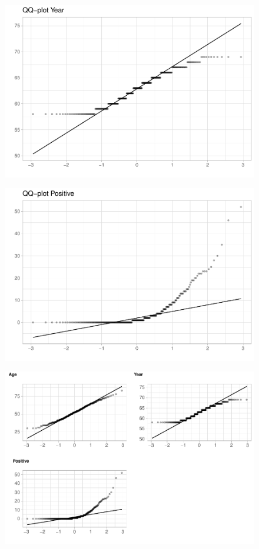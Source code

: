 \begin{figure}[H]\includegraphics[width=.9\linewidth]{img/EDA2_files/figure-latex/unnamed-chunk-18-2} \caption{}\end{figure}

\begin{figure}[H]\includegraphics[width=.9\linewidth]{img/EDA2_files/figure-latex/unnamed-chunk-18-3} \caption{}\end{figure}

\begin{figure}[H]\includegraphics[width=.9\linewidth]{img/EDA2_files/figure-latex/unnamed-chunk-18-4} \caption{}\end{figure}

